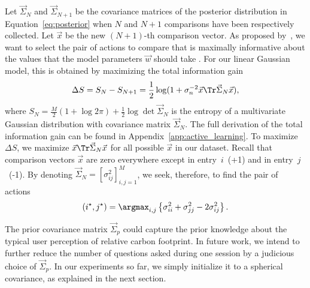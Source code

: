 Let $\vec{\Sigma}_N$ and  $\vec{\Sigma}_{N+1}$ be the covariance matrices of the posterior distribution in Equation~\eqref{eq:posterior} when $N$ and $N+1$ comparisons have been respectively collected.
Let $\vec{x}$ be the new $(N+1)$-th comparison vector.
As proposed by~\citet{mackay1992information}, we want to select the pair of actions to compare that is maximally informative about the values that the model parameters $\vec{w}$ should take \citep{chu2005extensions, houlsby2012collaborative}.
For our linear Gaussian model, this is obtained by maximizing the total information gain
\begin{equation}
	\Delta S = S_N - S_{N+1} = \frac{1}{2} \log (1 + \sigma_n^{-2} \vec{x}\Tr \vec{\Sigma}_N \vec{x}),
\end{equation}
where $S_N = \frac{M}{2}(1 + \log 2 \pi) + \frac{1}{2} \log \det \vec{\Sigma}_N$ is the entropy of a multivariate Gaussian distribution with covariance matrix $\vec{\Sigma}_N$.
The full derivation of the total information gain can be found in Appendix~\ref{app:active_learning}.
To maximize $\Delta S$, we maximize $ \vec{x}\Tr \vec{\Sigma}_N \vec{x} $ for all possible $ \vec{x} $ in our dataset.
Recall that comparison vectors $ \vec{x} $ are zero everywhere except in entry~$i$~(+1) and in entry~$j$~(-1).
By denoting $\vec{\Sigma}_N = [\sigma_{ij}^2]_{i, j = 1}^M$, we seek, therefore, to find the pair of actions
\begin{equation*}
	(i^\star, j^\star) = \argmax_{i, j} \left\{ \sigma_{ii}^2 + \sigma_{jj}^2 - 2 \sigma_{ij}^2 \right\}.
\end{equation*}

The prior covariance matrix $\vec{\Sigma}_p$ could capture the prior knowledge about the typical user perception of relative carbon footprint.
In future work, we intend to further reduce the number of questions asked during one session by a judicious choice of $\vec{\Sigma}_p$.
In our experiments so far, we simply initialize it to a spherical covariance, as explained in the next section.
